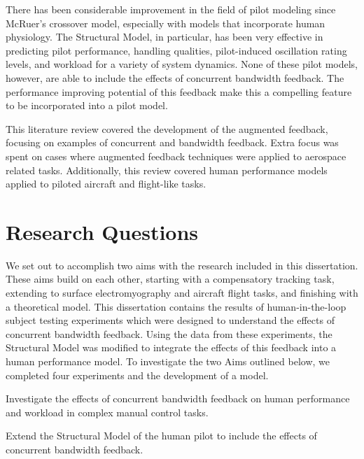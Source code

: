 There has been considerable improvement in the field of pilot modeling since McRuer's crossover model, especially with models that incorporate human physiology.
The Structural Model, in particular, has been very effective in predicting pilot performance, handling qualities, pilot-induced oscillation rating levels, and workload for a variety of system dynamics.
None of these pilot models, however, are able to include the effects of concurrent bandwidth feedback.
The performance improving potential of this feedback make this a compelling feature to be incorporated into a pilot model.

This literature review covered the development of the augmented feedback, focusing on examples of concurrent and bandwidth feedback.
Extra focus was spent on cases where augmented feedback techniques were applied to aerospace related tasks.
Additionally, this review covered human performance models applied to piloted aircraft and flight-like tasks.

\section{Research Questions}
\label{sec:intro_questions}
We set out to accomplish two aims with the research included in this dissertation.
These aims build on each other, starting with a compensatory tracking task, extending to surface electromyography and aircraft flight tasks, and finishing with a theoretical model.
This dissertation contains the results of human-in-the-loop subject testing experiments which were designed to understand the effects of concurrent bandwidth feedback.
Using the data from these experiments, the Structural Model was modified to integrate the effects of this feedback into a human performance model.
To investigate the two Aims outlined below, we completed four experiments and the development of a model.

\begin{description}[align=left]
    \item [Aim One] Investigate the effects of concurrent bandwidth feedback on human performance and workload in complex manual control tasks.
    \item [Aim Two] Extend the Structural Model of the human pilot to include the effects of concurrent bandwidth feedback.
\end{description}

